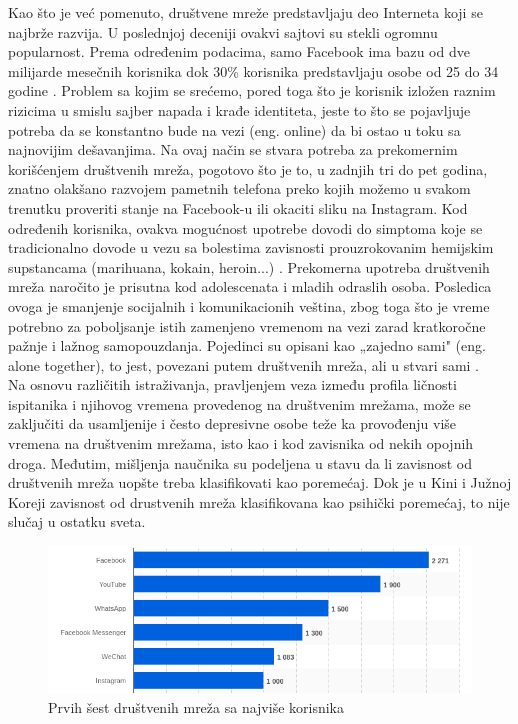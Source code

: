 \documentclass[a4paper]{article}
\newtheorem{primer}{Primer}[section]
\begin{document}
\indent\indent Kao što je već pomenuto, društvene mreže predstavljaju deo Interneta koji se najbrže razvija. U poslednjoj deceniji ovakvi sajtovi su stekli ogromnu popularnost. Prema određenim podacima, samo Facebook ima bazu od dve milijarde mesečnih korisnika dok 30\% korisnika predstavljaju osobe od 25 do 34 godine \cite{socialN}. Problem sa kojim se srećemo, pored toga što je korisnik izložen raznim rizicima u smislu sajber napada i krađe identiteta, jeste to što se pojavljuje potreba da se konstantno bude na vezi (eng. online) da bi ostao u toku sa najnovijim dešavanjima. Na ovaj način se stvara potreba za prekomernim korišćenjem društvenih mreža, pogotovo što je to, u zadnjih tri do pet godina, znatno olakšano razvojem pametnih telefona preko kojih možemo u svakom trenutku proveriti stanje na Facebook-u ili okaciti sliku na Instagram. Kod određenih korisnika, ovakva mogućnost upotrebe dovodi do simptoma koje se tradicionalno dovode u vezu sa bolestima zavisnosti prouzrokovanim hemijskim supstancama (marihuana, kokain, heroin...)  \cite{snsa}. Prekomerna upotreba društvenih mreža naročito je prisutna kod adolescenata i mladih odraslih osoba. Posledica ovoga je smanjenje socijalnih i komunikacionih veština, zbog toga što je vreme potrebno za poboljsanje istih zamenjeno vremenom na vezi zarad kratkoročne pažnje i lažnog samopouzdanja. Pojedinci su opisani kao „zajedno sami" (eng. alone together), to jest, povezani putem društvenih mreža, ali u stvari sami \cite{turkle2017alone}.
\\
\indent Na osnovu različitih istraživanja, pravljenjem veza između profila ličnosti ispitanika i njihovog vremena provedenog na društvenim mrežama, može se zaključiti da usamljenije i često depresivne osobe teže ka provođenju više vremena na društvenim mrežama, isto kao i kod zavisnika od nekih opojnih droga. Međutim, mišljenja naučnika su podeljena u stavu da li zavisnost od društvenih mreža uopšte treba klasifikovati kao poremećaj. Dok je u Kini i Južnoj Koreji zavisnost od drustvenih mreža klasifikovana kao psihički poremećaj, to nije slučaj u ostatku sveta.
\\
\begin{figure}[h!]
\begin{center}
\includegraphics[scale=0.5]{top_6_networks.png}
\end{center}
\caption{Prvih šest društvenih mreža sa najviše korisnika}
\label{fig:top_networks}
\end{figure}
\end{document}

